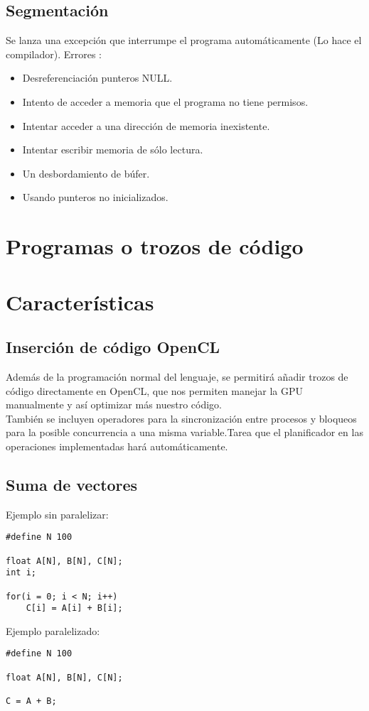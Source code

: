 \documentclass[12pt,a4paper]{article}
\begin{document}
\subsection{Segmentación}
Se lanza una excepción que interrumpe el programa automáticamente (Lo hace el
compilador).
Errores :
\begin{itemize}
\item Desreferenciación punteros NULL.
\item Intento de acceder a memoria que el programa no tiene permisos.
\item Intentar acceder a una dirección de memoria inexistente.
\item Intentar escribir memoria de sólo lectura.
\item Un desbordamiento de búfer. 
\item Usando punteros no inicializados.
\end{itemize}
\section{Programas o trozos de código}
\section{Características}
\subsection{Inserción de código OpenCL}
Además de la programación normal del lenguaje, se permitirá añadir trozos de
código directamente en OpenCL, que nos permiten manejar la GPU manualmente y así
optimizar más nuestro código. 
 \\ También se incluyen operadores para la sincronización entre procesos y
 bloqueos para la posible concurrencia a una misma variable.Tarea que el
 planificador en las operaciones implementadas hará automáticamente.
\subsection{Suma de vectores}
Ejemplo sin paralelizar:
\begin{lstlisting}
#define N 100

float A[N], B[N], C[N];
int i;

for(i = 0; i < N; i++)
	C[i] = A[i] + B[i];
\end{lstlisting}

Ejemplo paralelizado:
\begin{lstlisting}
#define N 100

float A[N], B[N], C[N];

C = A + B;
\end{lstlisting}
\end{document}
